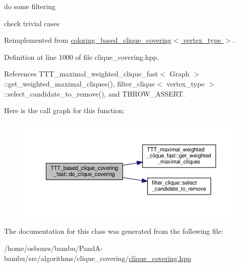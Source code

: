do some filtering

check trivial cases 

Reimplemented from \hyperlink{classcoloring__based__clique__covering_ab6db4b8e878397afcd5378715d438046}{coloring\+\_\+based\+\_\+clique\+\_\+covering$<$ vertex\+\_\+type $>$}.



Definition at line 1000 of file clique\+\_\+covering.\+hpp.



References T\+T\+T\+\_\+maximal\+\_\+weighted\+\_\+clique\+\_\+fast$<$ Graph $>$\+::get\+\_\+weighted\+\_\+maximal\+\_\+cliques(), filter\+\_\+clique$<$ vertex\+\_\+type $>$\+::select\+\_\+candidate\+\_\+to\+\_\+remove(), and T\+H\+R\+O\+W\+\_\+\+A\+S\+S\+E\+RT.

Here is the call graph for this function\+:
\nopagebreak
\begin{figure}[H]
\begin{center}
\leavevmode
\includegraphics[width=350pt]{d2/d1a/classTTT__based__clique__covering__fast_a64be6008ee231bbaf326cef4b502e643_cgraph}
\end{center}
\end{figure}


The documentation for this class was generated from the following file\+:\begin{DoxyCompactItemize}
\item 
/home/osboxes/bambu/\+Pand\+A-\/bambu/src/algorithms/clique\+\_\+covering/\hyperlink{clique__covering_8hpp}{clique\+\_\+covering.\+hpp}\end{DoxyCompactItemize}
